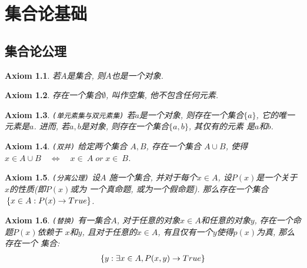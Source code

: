\chapter{集合论基础}

\section{集合论公理}
\newtheorem{axiomOne}{Axiom}[section]
\begin{axiomOne}
    若$A$是集合, 则$A$也是一个对象.
\end{axiomOne}

\newtheorem{axiomTwo}[axiomOne]{Axiom}
\begin{axiomTwo}
    存在一个集合$\emptyset$, 叫作空集, 他不包含任何元素.
\end{axiomTwo}

\newtheorem{axiomThree}[axiomOne]{Axiom}
\begin{axiomThree}
    {\tt (单元素集与双元素集)}\quad
    若$a$是一个对象, 则存在一个集合$\{a\}$, 它的唯一元素是$a$.
    进而, 若$a, b$是对象, 则存在一个集合$\{a, b\}$, 其仅有的元素
    是$a$和$b$.
\end{axiomThree}

\newtheorem{axiomFour}[axiomOne]{Axiom}
\begin{axiomFour}
    {\tt (双并)\quad}
    给定两个集合 $A, B$, 存在一个集合 $A\cup B$, 
    使得$x\in A\cup B\quad\Longleftrightarrow\quad x\in~A\;or\; x\in~B$.
\end{axiomFour}

\newtheorem{axiomFive}[axiomOne]{Axiom}
\begin{axiomFive}
    {\tt(分离公理)\quad}
    设$A$ 施一个集合, 并对于每个$x\in A$, 设$P(x)$是一个关于$x$的性质(即$P(x)$或为
    一个真命题, 或为一个假命题). 那么存在一个集合$\,\{x\in A: P(x)\to {True}\}$.
\end{axiomFive}

\newtheorem{axiomSix}[axiomOne]{Axiom}
\begin{axiomSix}
    {\tt (替换)\quad}
    有一集合$A$, 对于任意的对象$x\in A$和任意的对象$y$, 存在一个命题$P(x)$依赖于
    $x$和$y$, 且对于任意的$x\in A$, 有且仅有一个$y$使得$p(x)$为真, 那么存在一个
    集合:
    \begin{align*}
    \{y: \exists x\in A, P(x,y)\to {True}\}
    \end{align*}
\end{axiomSix}